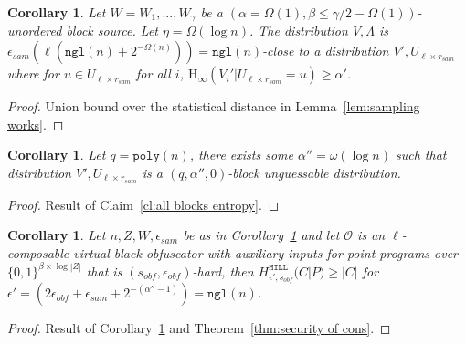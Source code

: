 \documentclass[11pt]{article}
\newcommand{\thref}[1]{\mbox{Theorem~\ref{#1}}}
\newcommand{\corref}[1]{\mbox{Corollary~\ref{#1}}}
\newcommand{\lemref}[1]{\mbox{Lemma~\ref{#1}}}
\newcommand{\clref}[1]{\mbox{Claim~\ref{#1}}}
\newcommand{\zo}{\ensuremath{\{0, 1\}}}
\newcommand{\hill}{\ensuremath{\mathtt{HILL}}\xspace}
\newcommand{\poly}{\ensuremath{\mathtt{poly}}\xspace}
\newcommand{\ngl}{\ensuremath{\mathtt{ngl}}\xspace}
\newcommand{\Hoo}{\mathrm{H}_\infty}
\newtheorem{corollary}[theorem]{Corollary}
\begin{document}
\begin{corollary}
\label{cor:samp sec}
Let $W = W_1,..., W_\gamma$ be a $(\alpha = \Omega(1), \beta \leq \gamma /2-\Omega(1))$-unordered block source.  Let $\eta = \Omega(\log n)$.  
The distribution $V, \Lambda$ is $\epsilon_{sam}(\ell (\ngl(n) +2^{-\Omega(n)})) = \ngl(n)$-close to a distribution $V', U_{\ell\times r_{sam}}$ where for $u\in U_{\ell\times r_{sam}}$ for all $i$, $\Hoo(V_i' | U_{\ell\times r_{sam}} =u)\geq \alpha'$.
\end{corollary}
\begin{proof}
Union bound over the statistical distance in \lemref{lem:sampling works}.
\end{proof}

\begin{corollary}
\label{cor:v are unguessable}
Let $q = \poly(n)$, there exists some $\alpha'' = \omega(\log n)$ such that distribution $V' , U_{\ell\times r_{sam}}$ is a $(q, \alpha'', 0)$-block unguessable distribution.
\end{corollary}
\begin{proof}
Result of \clref{cl:all blocks entropy}.
\end{proof}

\begin{corollary}
\label{cor:samp unguess}
Let $n, Z, W, \epsilon_{sam}$ be as in \corref{cor:samp sec} and let $\mathcal{O}$ is an $\ell$-composable virtual black obfuscator with auxiliary inputs for point programs over $\zo^{\beta\times \log |Z|}$ that is $(s_{obf}, \epsilon_{obf})$-hard, then $H^{\hill}_{\epsilon', s_{obf}}(C | P) \geq |C|$ for $\epsilon' = (2\epsilon_{obf} + \epsilon_{sam}+ 2^{-(\alpha''-1)}) = \ngl(n)$.
\end{corollary}
\begin{proof}
Result of \corref{cor:v are unguessable} and \thref{thm:security of cons}.
\end{proof}
\end{document}
